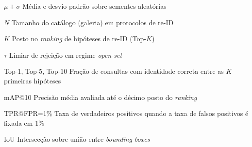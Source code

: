 \begin{simbolos}
  \item[$\mu\pm\sigma$] Média e desvio padrão sobre sementes aleatórias
  \item[$N$] Tamanho do catálogo (galeria) em protocolos de re-ID
  \item[$K$] Posto no \textit{ranking} de hipóteses de re-ID (Top-$K$)
  \item[$\tau$] Limiar de rejeição em regime \textit{open-set}
  \item[Top-1, Top-5, Top-10] Fração de consultas com identidade correta entre as $K$ primeiras hipóteses
  \item[mAP@10] Precisão média avaliada até o décimo posto do \textit{ranking}
  \item[TPR@FPR=1\%] Taxa de verdadeiros positivos quando a taxa de falsos positivos é fixada em 1\%
  \item[IoU] Intersecção sobre união entre \textit{bounding boxes}
\end{simbolos}
\cleardoublepage

\tableofcontents*
\cleardoublepage
